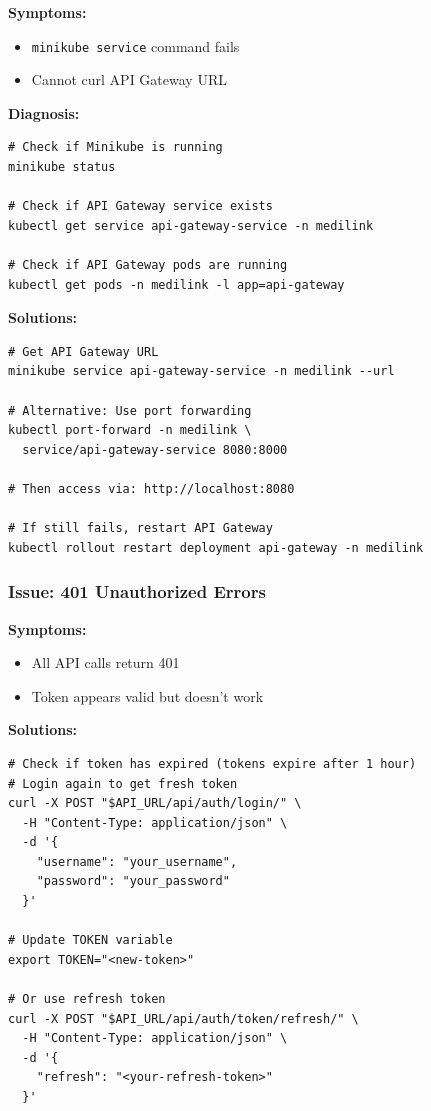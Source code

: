 \documentclass[12pt,a4paper]{article}
\begin{document}
\textbf{Symptoms:}
\begin{itemize}
    \item \texttt{minikube service} command fails
    \item Cannot curl API Gateway URL
\end{itemize}

\textbf{Diagnosis:}
\begin{lstlisting}[style=bash]
# Check if Minikube is running
minikube status

# Check if API Gateway service exists
kubectl get service api-gateway-service -n medilink

# Check if API Gateway pods are running
kubectl get pods -n medilink -l app=api-gateway
\end{lstlisting}

\textbf{Solutions:}
\begin{lstlisting}[style=bash]
# Get API Gateway URL
minikube service api-gateway-service -n medilink --url

# Alternative: Use port forwarding
kubectl port-forward -n medilink \
  service/api-gateway-service 8080:8000

# Then access via: http://localhost:8080

# If still fails, restart API Gateway
kubectl rollout restart deployment api-gateway -n medilink
\end{lstlisting}

\subsubsection{Issue: 401 Unauthorized Errors}

\textbf{Symptoms:}
\begin{itemize}
    \item All API calls return 401
    \item Token appears valid but doesn't work
\end{itemize}

\textbf{Solutions:}
\begin{lstlisting}[style=bash]
# Check if token has expired (tokens expire after 1 hour)
# Login again to get fresh token
curl -X POST "$API_URL/api/auth/login/" \
  -H "Content-Type: application/json" \
  -d '{
    "username": "your_username",
    "password": "your_password"
  }'

# Update TOKEN variable
export TOKEN="<new-token>"

# Or use refresh token
curl -X POST "$API_URL/api/auth/token/refresh/" \
  -H "Content-Type: application/json" \
  -d '{
    "refresh": "<your-refresh-token>"
  }'
\end{lstlisting}
\end{document}
